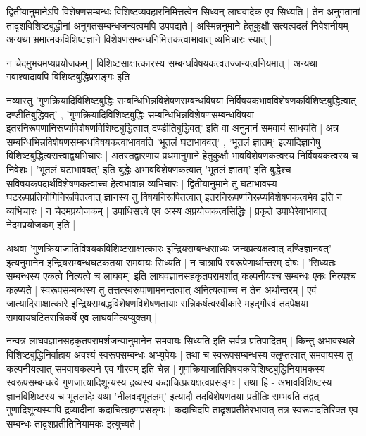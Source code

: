 द्वितीयानुमानेऽपि विशेषणसम्बन्धः विशिष्टव्यवहारनिमित्तत्वेन सिध्यन् लाघवादेक एव सिध्यति | तेन अनुगतानां तादृशविशिष्टबुद्धीनां अनुगतसम्बन्धजन्यत्वमपि उपपद्यते | अस्मिन्ननुमाने हेतुकुक्षौ सत्यत्वदलं निवेशनीयम् | अन्यथा भ्रमात्मकविशिष्टज्ञाने विशेषणसम्बन्धनिमित्तकत्वाभावात् व्यभिचारः स्यात् | 

न चेदमुभयमप्यप्रयोजकम् | विशिष्टसाक्षात्कारस्य सम्बन्धविषयकत्वतज्जन्यत्वनियमात् | अन्यथा गवाश्वादावपि विशिष्टबुद्धिप्रसङ्गः इति |

नव्यास्तु 'गुणक्रियादिविशिष्टबुद्धिः सम्बन्धिभिन्नविशेषणसम्बन्धविषया निर्विषयकभावविशेषणकविशिष्टबुद्धित्वात् दण्डीतिबुद्धिवत्' , 'गुणक्रियादिविशिष्टबुद्धिः सम्बन्धिभिन्नविशेषणसम्बन्धविषया इतरनिरूपणानिरूप्यविशेषणविशिष्टबुद्धित्वात् दण्डीतिबुद्धिवत्' इति वा अनुमानं समवायं साधयति | अत्र सम्बन्धिभिन्नविशेषणसम्बन्धविषयकत्वाभाववति 'भूतलं घटाभाववत्' , 'भूतलं ज्ञातम्' इत्यादिज्ञानेषु विशिष्टबुद्धित्वसत्त्वाद्व्यभिचारः | अतस्तद्वारणाय प्रथमानुमाने हेतुकुक्षौ भावविशेषणकत्वस्य निर्विषयकत्वस्य च निवेशः | 'भूतलं घटाभाववत्' इति बुद्धेः‌ अभावविशेषणकत्वात् 'भूतलं ज्ञातम्' इति बुद्धेश्च सविषयकपदार्थविशेषणकत्वाच्च हेत्वभावान्न व्यभिचारः | द्वितीयानुमाने तु घटाभावस्य घटरूपप्रतियोगिनिरूपितत्वात् ज्ञानस्य तु विषयनिरूपितत्वात् इतरनिरूपणनिरूप्यविशेषणकत्वमेव इति न व्यभिचारः | न चेदमप्रयोजकम् | उपाधिसत्त्वे एव अस्य अप्रयोजकत्वसिद्धिः | प्रकृते उपाधेरेवाभावात् नेदमप्रयोजकम् इति |

अथवा 'गुणक्रियाजातिविषयकविशिष्टसाक्षात्कारः इन्द्रियसम्बन्धसाध्यः जन्यप्रत्यक्षत्वात् दण्डिज्ञानवत्' इत्यनुमानेन इन्द्रियसम्बन्धघटकतया समवायः सिध्यति | न चात्रापि स्वरूपेणार्थान्तरम् दोषः | 'सिध्यतः सम्बन्धस्य एकत्वे नित्यत्वे च लाघवम्' इति लाघवज्ञानसहकृतपरामर्शात् कल्पनीयश्च सम्बन्धः एकः नित्यश्च कल्प्यते | स्वरूपसम्बन्धस्य तु तत्तत्स्वरूपाणामनन्तत्वात् अनित्यत्वाच्च न तेन अर्थान्तरम् | एवं जात्यादिसाक्षात्कारे इन्द्रियसम्बद्धविशेषणविशेषणतायाः सन्निकर्षत्वस्वीकारे महद्गौरवं तदपेक्षया समवायघटितसन्निकर्षे एव लाघवमित्यप्युक्तम् |

नन्वत्र लाघवज्ञानसहकृतपरामर्शजन्यानुमानेन समवायः सिध्यति इति सर्वत्र प्रतिपादितम् | किन्तु अभावस्थले विशिष्टबुद्धिनिर्वाहाय अवश्यं स्वरूपसम्बन्धः अभ्युपेयः | तथा च स्वरूपसम्बन्धस्य क्लृप्तत्वात् समवायस्य तु कल्पनीयत्वात् समवायकल्पने एव गौरवम् इति चेन्न | गुणक्रियाजातिविषयकविशिष्टबुद्धिनियामकस्य स्वरूपसम्बन्धत्वे गुणजात्यादिशून्यस्य द्रव्यस्य कदाचित्प्रत्यक्षत्वप्रसङ्गः | तथा हि - अभावविशिष्टस्य ज्ञानविशिष्टस्य च भूतलादेः यथा 'नीलवद्भूतलम्' इत्यादौ तदविशेषणतया प्रतीतिः सम्भवति तद्वत् गुणादिशून्यस्यापि द्रव्यादीनां कदाचित्ग्रहणप्रसङ्गः | कदाचिदपि तादृशप्रतीतेरभावात् तत्र स्वरूपादतिरिक्त एव सम्बन्धः तादृशप्रतीतिनियामकः इत्युच्यते |

